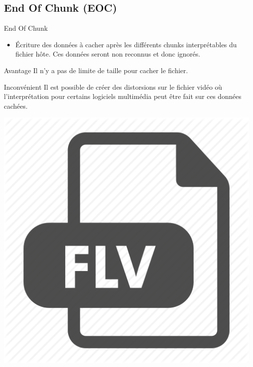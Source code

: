 \documentclass{beamer}
\begin{document}
    \subsection{End Of Chunk (EOC)}
    \begin{frame}
    
	\begin{block}{End Of Chunk}
	\begin{itemize}
	[circle]
	\item Écriture des données à cacher après les différents chunks interprétables 
	du fichier hôte. Ces données seront non reconnus et donc ignorés.  
	\end{itemize}
	\end{block}
	
	\begin{exampleblock}{Avantage} 
	Il n'y a pas de limite de taille pour cacher le fichier. 
	\end{exampleblock}
	
	\begin{alertblock}{Inconvénient} 
	Il est possible de créer des distorsions sur le fichier vidéo où 
	l'interprétation pour certains logiciels multimédia peut être fait sur 
	ces données cachées. 
	\end{alertblock}
	
	\hspace{4.3cm}
    \includegraphics[scale=0.08]{pictures/flv_512.png}
    
    \end{frame}
  
\end{document}

